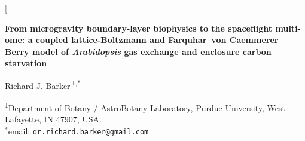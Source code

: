 \documentclass[10pt,twocolumn,a4paper]{article}
\begin{document}
\sloppy

\twocolumn[{%
  
  \vspace*{2mm}
  {\fontsize{20}{24}\selectfont\sffamily\bfseries\color{npjdark}
  From microgravity boundary-layer biophysics to the spaceflight multi-ome: a coupled lattice-Boltzmann and Farquhar--von Caemmerer--Berry model of \textit{Arabidopsis} gas exchange and enclosure carbon starvation\par}
  
  \vspace{4mm}
  {\large\sffamily
  Richard J. Barker\,\textsuperscript{1,$\ast$}\par}
  
  \vspace{3mm}
  {\footnotesize\sffamily\color{npjgray}
  \textsuperscript{1}Department of Botany / AstroBotany Laboratory, Purdue University, West Lafayette, IN 47907, USA.\\
  $^{\ast}$email: \textcolor{npjlink}{\texttt{dr.richard.barker@gmail.com}}\par}
  
}
\end{document}
